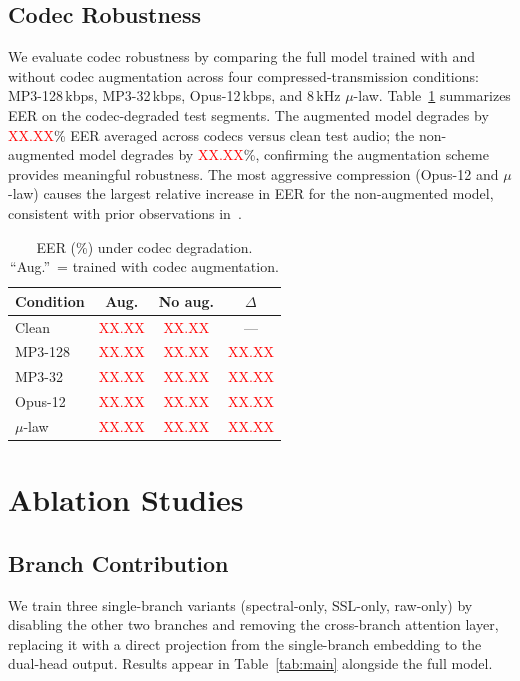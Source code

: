 \documentclass[10pt,twocolumn,a4paper]{article}
\newcommand{\NUM}{\textcolor{red}{XX.XX}}
\begin{document}
\subsection{Codec Robustness}

We evaluate codec robustness by comparing the full model trained with and without codec augmentation across four compressed-transmission conditions: MP3-128\,kbps, MP3-32\,kbps, Opus-12\,kbps, and 8\,kHz $\mu$-law. Table~\ref{tab:codec} summarizes EER on the codec-degraded test segments. The augmented model degrades by \NUM\% EER averaged across codecs versus clean test audio; the non-augmented model degrades by \NUM\%, confirming the augmentation scheme provides meaningful robustness. The most aggressive compression (Opus-12 and $\mu$-law) causes the largest relative increase in EER for the non-augmented model, consistent with prior observations in~\cite{rawnetlite_2025}.

\begin{table}[t]
\centering
\caption{EER (\%) under codec degradation. ``Aug.''\ = trained with codec augmentation.}
\label{tab:codec}
\small
\begin{tabular}{@{}lccc@{}}
\toprule
\textbf{Condition} & \textbf{Aug.} & \textbf{No aug.} & $\Delta$ \\
\midrule
Clean & \NUM & \NUM & --- \\
MP3-128 & \NUM & \NUM & \NUM \\
MP3-32 & \NUM & \NUM & \NUM \\
Opus-12 & \NUM & \NUM & \NUM \\
$\mu$-law & \NUM & \NUM & \NUM \\
\bottomrule
\end{tabular}
\end{table}

\section{Ablation Studies}
\label{sec:ablation}

\subsection{Branch Contribution}

We train three single-branch variants (spectral-only, SSL-only, raw-only) by disabling the other two branches and removing the cross-branch attention layer, replacing it with a direct projection from the single-branch embedding to the dual-head output. Results appear in Table~\ref{tab:main} alongside the full model.
\end{document}
